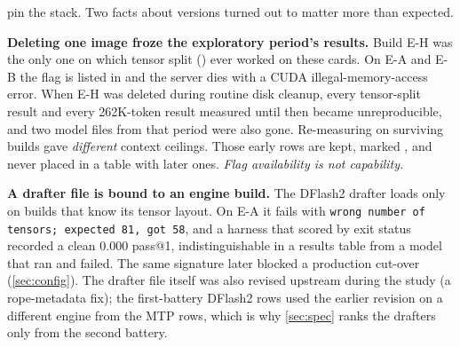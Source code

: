 \begin{table}[t]
\centering\small
\caption{Model builds. All are Unsloth Dynamic GGUFs of Qwen3.8-27B and all embed the MTP head.
\QsixXL{} is the divergence reference. Sizes in bytes as downloaded; SHA-256 prefixes are in the
repository.}\label{tab:arms}
\end{table}

 pin the stack. Two facts about versions turned out to matter more than
expected.

\textbf{Deleting one image froze the exploratory period's results.} Build E-H was the only one on which tensor
split () ever worked on these cards. On E-A and E-B the flag is listed in
 and the server dies with a CUDA illegal-memory-access error. When E-H was deleted during
routine disk cleanup, every tensor-split result and every 262K-token result measured until then became
unreproducible, and two model files from that period were also gone. Re-measuring on surviving builds
gave \emph{different} context ceilings. Those early rows are kept, marked \hist{}, and never placed
in a table with later ones. \emph{Flag availability is not capability.}

\textbf{A drafter file is bound to an engine build.} The DFlash2 drafter loads only on builds that
know its tensor layout. On E-A it fails with \texttt{wrong number of tensors; expected 81, got 58},
and a harness that scored by exit status recorded a clean 0.000 pass@1, indistinguishable in a results
table from a model that ran and failed. The same signature later blocked a production cut-over
(\cref{sec:config}). The drafter file itself was also revised upstream during the study (a rope-metadata
fix); the first-battery DFlash2 rows used the earlier revision on a different engine from the MTP
rows, which is why \cref{sec:spec} ranks the drafters only from the second battery.

